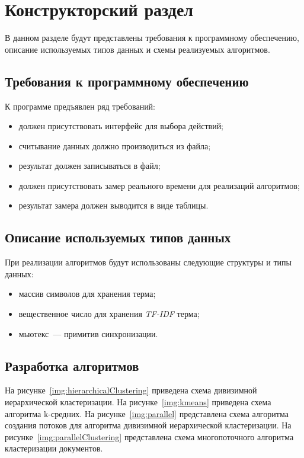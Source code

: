 \chapter{Конструкторский раздел}

В данном разделе будут представлены требования к программному обеспечению, описание используемых типов данных и схемы реализуемых алгоритмов.

\section{Требования к программному обеспечению}

К программе предъявлен ряд требований:
\begin{itemize}
	\item должен присутствовать интерфейс для выбора действий;
	\item считывание данных должно производиться из файла;
	\item результат должен записываться в файл;
	\item должен присутствовать замер реального времени для реализаций
алгоритмов;
	\item результат замера должен выводится в виде таблицы.
\end{itemize}

\section{Описание используемых типов данных}

При реализации алгоритмов будут использованы следующие структуры и типы данных:
\begin{itemize}
	\item массив символов для хранения терма;
	\item вещественное число для хранения \textit{TF-IDF} терма;
	\item мьютекс~--- примитив синхронизации.
\end{itemize}

\section{Разработка алгоритмов}

На рисунке~\ref{img:hierarchicalClustering} приведена схема дивизимной иерархической кластеризации.
На рисунке~\ref{img:kmeans} приведена схема алгоритма k-средних.
На рисунке~\ref{img:parallel} представлена схема алгоритма создания потоков для алгоритма дивизимной иерархической кластеризации.
На рисунке~\ref{img:parallelClustering} представлена схема многопоточного алгоритма кластеризации документов.

